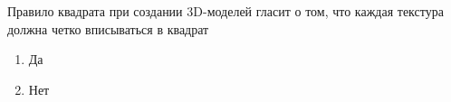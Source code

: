 
Правило квадрата при создании 3D-моделей гласит о том, что каждая текстура должна четко вписываться в квадрат

\begin{enumerate}
    \item Да
    \item Нет
\end{enumerate}